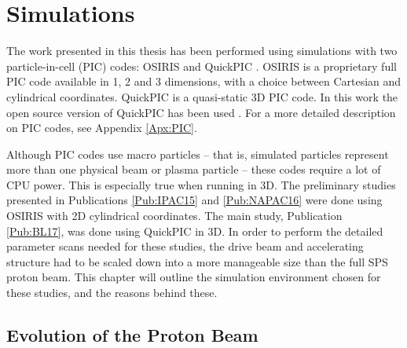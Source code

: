 %
%

\chapter{Simulations}
\label{Ch:Sim}

The work presented in this thesis has been performed using simulations with two particle-in-cell (PIC) codes:
OSIRIS \cite{fonseca:2002} and QuickPIC \cite{an:2013, huang:2006}.
OSIRIS is a proprietary full PIC code available in 1, 2 and 3 dimensions, with a choice between Cartesian and cylindrical coordinates.
QuickPIC is a quasi-static 3D PIC code. In this work the open source version of QuickPIC has been used \cite{add:quickpic:web}.
For a more detailed description on PIC codes, see Appendix \ref{Apx:PIC}.

Although PIC codes use macro particles -- that is, simulated particles represent more than one physical beam or plasma particle -- these codes require a lot of CPU power.
This is especially true when running in 3D.
The preliminary studies presented in Publications \ref{Pub:IPAC15} and \ref{Pub:NAPAC16} were done using OSIRIS with 2D cylindrical coordinates.
The main study, Publication \ref{Pub:BL17}, was done using QuickPIC in 3D.
In order to perform the detailed parameter scans needed for these studies, the drive beam and accelerating structure had to be scaled down into a more manageable size than the full SPS proton beam.
This chapter will outline the simulation environment chosen for these studies, and the reasons behind these.

\section{Evolution of the Proton Beam}
\label{Sim:PBeam}

